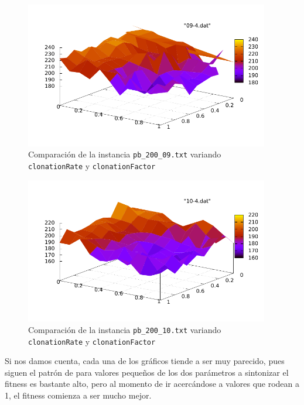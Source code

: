 \begin{figure}[h!]
\begin{center}
	\includegraphics[width=0.95\textwidth]{img/09-4.pdf}
	\caption{Comparaci\'on de la instancia \texttt{pb\_200\_09.txt} variando \texttt{clonationRate} y \texttt{clonationFactor}}
	\label{fig:4-2}
\end{center}
\end{figure}

\begin{figure}[h!]
\begin{center}
	\includegraphics[width=0.95\textwidth]{img/10-4.pdf}
	\caption{Comparaci\'on de la instancia \texttt{pb\_200\_10.txt} variando \texttt{clonationRate} y \texttt{clonationFactor}}
	\label{fig:4-3}
\end{center}
\end{figure}

Si nos damos cuenta, cada una de los gráficos tiende a ser muy parecido,
pues siguen el patrón de para valores pequeños de los dos parámetros a sintonizar
el fitness es bastante alto, pero al momento de ir acercándose a valores que rodean a 1,
el fitness comienza a ser mucho mejor.

